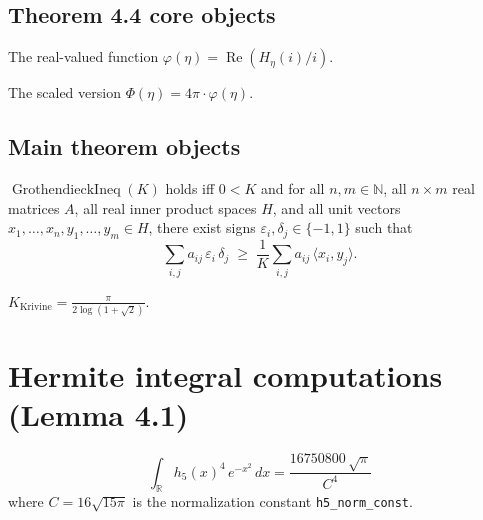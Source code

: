 \section{Theorem 4.4 core objects}

\begin{definition}[$\varphi$]
  \label{def:varphi}
  \leanok
  The real-valued function $\varphi(\eta) = \operatorname{Re}(H_\eta(i)/i)$.
\end{definition}

\begin{definition}[$\Phi$]
  \label{def:Phi}
  \leanok
  The scaled version $\Phi(\eta) = 4\pi \cdot \varphi(\eta)$.
\end{definition}

\section{Main theorem objects}

\begin{definition}
  \label{def:GrothendieckIneq}
  \leanok
  $\operatorname{GrothendieckIneq}(K)$ holds iff $0 < K$ and for all
  $n, m \in \mathbb{N}$, all $n \times m$ real matrices $A$,
  all real inner product spaces $H$, and all unit vectors
  $x_1, \ldots, x_n, y_1, \ldots, y_m \in H$, there exist signs
  $\varepsilon_i, \delta_j \in \{-1, 1\}$ such that
  \[
    \sum_{i,j} a_{ij}\, \varepsilon_i\, \delta_j
    \;\geq\; \frac{1}{K} \sum_{i,j} a_{ij}\, \langle x_i, y_j \rangle.
  \]
\end{definition}

\begin{definition}
  \label{def:KrivineBound}
  \leanok
  $K_{\text{Krivine}} = \frac{\pi}{2\log(1+\sqrt{2})}$.
\end{definition}

\chapter{Hermite integral computations (Lemma 4.1)}

\begin{lemma}
  \label{lem:4_1_eq26}
  \leanok
  \[
    \int_{\mathbb{R}} h_5(x)^4\, e^{-x^2}\,dx
    = \frac{16750800\,\sqrt{\pi}}{C^4}
  \]
  where $C = 16\sqrt{15\pi}$ is the normalization constant \texttt{h5\_norm\_const}.
\end{lemma}

